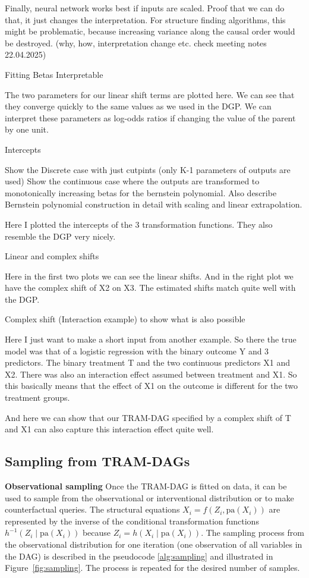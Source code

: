 Finally, neural network works best if inputs are scaled. Proof that we can do that, it just changes the interpretation. For structure finding algorithms, this might be problematic, because increasing variance along the causal order would be destroyed. (why, how, interpretation change etc. check meeting notes 22.04.2025)

Fitting Betas Interpretable

The two parameters for our linear shift terms are plotted here. We can see that they converge quickly to the same values as we used in the DGP. We can interpret these parameters as log-odds ratios if changing the value of the parent by one unit.

Intercepts

Show the Discrete case with just cutpints (only K-1 parameters of outputs are used)
Show the continuous case where the outputs are transformed to monotonically increasing betas for the bernstein polynomial. Also describe Bernstein polynomial construction in detail with scaling and linear extrapolation.

Here I plotted the intercepts of the 3 transformation functions. They also resemble the DGP very nicely.


Linear and complex shifts

Here in the first two plots we can see the linear shifts. And in the right plot we have the complex shift of X2 on X3. The estimated shifts match quite well with the DGP.

Complex shift (Interaction example) to show what is also possible

Here I just want to make a short input from another example. So there the true model was that of a logistic regression with the binary outcome Y and 3 predictors. The binary treatment T and the two continuous predictors X1 and X2. There was also an interaction effect assumed between treatment and X1. So this basically means that the effect of X1 on the outcome is different for the two treatment groups.

And here we can show that our TRAM-DAG specified by a complex shift of T and X1 can also capture this interaction effect quite well.






\subsection{Sampling from TRAM-DAGs}

\textbf{Observational sampling} Once the TRAM-DAG is fitted on data, it can be used to sample from the observational or interventional distribution or to make counterfactual queries. 
The structural equations $X_i = f(Z_i, \text{pa}(X_i))$ are represented by the inverse of the conditional transformation functions $h^{-1}(Z_i \mid \text{pa}(X_i))$ because $Z_i = h(X_i \mid \text{pa}(X_i))$. The sampling process from the observational distribution for one iteration (one observation of all variables in the DAG) is described in the pseudocode \ref{alg:sampling} and illustrated in Figure~\ref{fig:sampling}. The process is repeated for the desired number of samples. 


